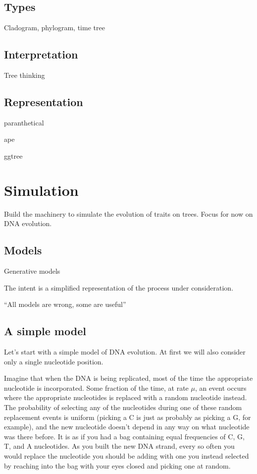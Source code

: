 \documentclass[
]{book}
\begin{document}
\hypertarget{types}{%
\section{Types}\label{types}}

Cladogram, phylogram, time tree

\hypertarget{interpretation}{%
\section{Interpretation}\label{interpretation}}

Tree thinking

\hypertarget{representation}{%
\section{Representation}\label{representation}}

paranthetical

ape

ggtree

\hypertarget{simulation}{%
\chapter{Simulation}\label{simulation}}

Build the machinery to simulate the evolution of traits on trees. Focus for now on DNA evolution.

\hypertarget{models}{%
\section{Models}\label{models}}

Generative models

The intent is a simplified representation of the process under consideration.

``All models are wrong, some are useful''

\hypertarget{a-simple-model}{%
\section{A simple model}\label{a-simple-model}}

Let's start with a simple model of DNA evolution. At first we will also consider only a single nucleotide position.

Imagine that when the DNA is being replicated, most of the time the appropriate nucleotide is incorporated. Some fraction of the time, at rate \(\mu\), an event occurs where the appropriate nucleotides is replaced with a random nucleotide instead. The probability of selecting any of the nucleotides during one of these random replacement events is uniform (picking a C is just as probably as picking a G, for example), and the new nucleotide doesn't depend in any way on what nucleotide was there before. It is as if you had a bag containing equal frequencies of C, G, T, and A nucleotides. As you built the new DNA strand, every so often you would replace the nucleotide you should be adding with one you instead selected by reaching into the bag with your eyes closed and picking one at random.
\end{document}
